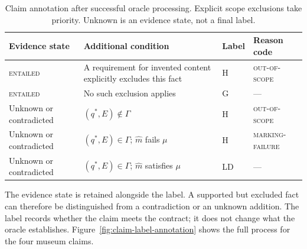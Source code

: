 \documentclass{clv2025}
\newcommand{\LD}{\textsc{LD}}
\newcommand{\Hall}{\textsc{H}}
\newcommand{\Grd}{\textsc{G}}
\begin{document}
\begin{table}[!ht]
\centering\small
\caption{Claim annotation after successful oracle processing. Explicit scope
exclusions take priority. Unknown is an evidence state, not a final label.}
\label{tab:claim-rule}
\begin{tabularx}{\linewidth}{@{}lYll@{}}
\toprule
Evidence state & Additional condition & Label & Reason code\\\midrule
\textsc{entailed} & A requirement for invented content explicitly excludes this fact & \Hall & \textsc{out-of-scope}\\
\textsc{entailed} & No such exclusion applies & \Grd & ---\\
Unknown or contradicted & $(q^*,E)\notin\Gamma$ & \Hall & \textsc{out-of-scope}\\
Unknown or contradicted & $(q^*,E)\in\Gamma$; $\widehat{m}$ fails $\mu$ & \Hall & \textsc{marking-failure}\\
Unknown or contradicted & $(q^*,E)\in\Gamma$; $\widehat{m}$ satisfies $\mu$ & \LD & ---\\
\bottomrule
\end{tabularx}
\end{table}

The evidence state is retained alongside the label. A supported but excluded
fact can therefore be distinguished from a contradiction or an unknown
addition. The label records whether the claim meets the contract; it does
not change what the oracle establishes. Figure~\ref{fig:claim-label-annotation}
shows the full process for the four museum claims.
\end{document}
